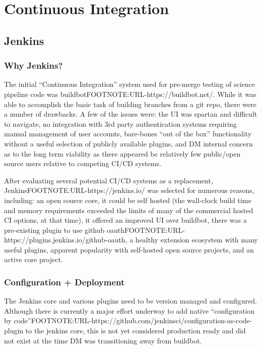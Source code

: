 \section{Continuous Integration}

\subsection{Jenkins}
\label{sec:jenkins}

\subsubsection{Why Jenkins?}

The initial ``Continuous Integration'' system used for pre-merge testing of
science pipeline code was buildbotFOOTNOTE:URL-https://buildbot.net/.  While it
was able to accomplish the basic task of building branches from a git repo,
there were a number of drawbacks.
A few of the issues were: the UI was spartan and difficult to navigate, no
integration with 3rd party authentication systems requiring manual management
of user accounts, bare-bones ``out of the box'' functionality without a useful
selection of publicly available plugins, and DM internal concern as to the long
term viability as there appeared be relatively few public/open source users
relative to competing CI/CD systems.

After evaluating several potential CI/CD systems as a replacement,
JenkinsFOOTNOTE:URL-https://jenkins.io/ was selected for numerous reasons,
including: an open source core, it could be self hosted (the wall-clock build
time and memory requirements exceeded the limits of many of the commercial
hosted CI options, at that time), it offered an improved UI over buildbot,
there was a pre-existing plugin to use github
oauthFOOTNOTE:URL-https://plugins.jenkins.io/github-oauth, a healthy extension
ecosystem with many useful plugins, apparent popularity with self-hosted
open source projects, and an active core project.

\subsubsection{Configuration + Deployment}

The Jenkins core and various plugins need to be version managed and configured.
Although there is currently a major effort underway to add native
``configuration by
code''FOOTNOTE:URL-https://github.com/jenkinsci/configuration-as-code-plugin to
the jenkins core, this is not yet considered production ready and did not exist
at the time DM was transitioning away from buildbot.

